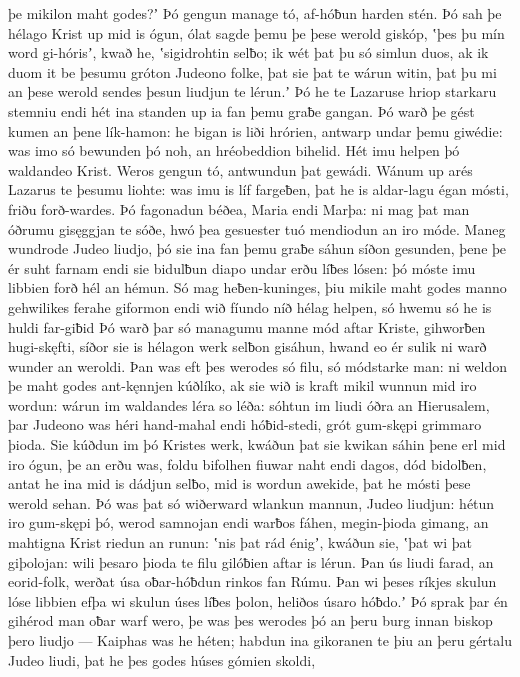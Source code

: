 þe mikilon maht godes?ʼ Þó gengun manage tó,
af-hóƀun harden stén. Þó sah þe hélago Krist
up mid is ógun, ólat sagde
þemu þe þese werold giskóp, ʽþes þu mín word gi-hórisʼ, kwað he,
ʽsigidrohtin selƀo; ik wét þat þu só simlun duos,
ak ik duom it be þesumu gróton Judeono folke,
þat sie þat te wárun witin, þat þu mi an þese werold sendes
þesun liudjun te lérun.ʼ Þó he te Lazaruse hriop
starkaru stemniu endi hét ina standen up
ia fan þemu graƀe gangan. Þó warð þe gést kumen
an þene lík-hamon: he bigan is liði hrórien,
antwarp undar þemu giwédie: was imo só bewunden þó noh,
an hréobeddion bihelid. Hét imu helpen þó
waldandeo Krist. Weros gengun tó,
antwundun þat gewádi. Wánum up arés
Lazarus te þesumu liohte: was imu is líf fargeƀen,
þat he is aldar-lagu égan mósti,
friðu forð-wardes. Þó fagonadun béðea,
Maria endi Marþa: ni mag þat man óðrumu
gisęggjan te sóðe, hwó þea gesuester tuó
mendiodun an iro móde. Maneg wundrode
Judeo liudjo, þó sie ina fan þemu graƀe sáhun
síðon gesunden, þene þe ér suht farnam
endi sie bidulƀun diapo undar erðu
líƀes lósen: þó móste imu libbien forð
hél an hémun. Só mag heƀen-kuninges,
þiu mikile maht godes manno gehwilikes
ferahe giformon endi wið fíundo níð
hélag helpen, só hwemu só he is huldi far-giƀid
Þó warð þar só managumu manne mód aftar Kriste,
gihworƀen hugi-skęfti, síðor sie is hélagon werk
selƀon gisáhun, hwand eo ér sulik ni warð
wunder an weroldi. Þan was eft þes werodes só filu,
só módstarke man: ni weldon þe maht godes
ant-kęnnjen kúðlíko, ak sie wið is kraft mikil
wunnun mid iro wordun: wárun im waldandes
léra so léða: sóhtun im liudi óðra
an Hierusalem, þar Judeono was
héri hand-mahal endi hóƀid-stedi,
grót gum-skępi grimmaro þioda.
Sie kúðdun im þó Kristes werk, kwáðun þat sie kwikan sáhin
þene erl mid iro ógun, þe an erðu was,
foldu bifolhen fiuwar naht endi dagos,
dód bidolƀen, antat he ina mid is dádjun selƀo,
mid is wordun awekide, þat he mósti þese werold sehan.
Þó was þat só wiðerward wlankun mannun,
Judeo liudjun: hétun iro gum-skępi þó,
werod samnojan endi warƀos fáhen,
megin-þioda gimang, an mahtigna Krist
riedun an runun: ʽnis þat rád énigʼ, kwáðun sie,
ʽþat wi þat giþolojan: wili þesaro þioda te filu
gilóƀien aftar is lérun. Þan ús liudi farad,
an eorid-folk, werðat úsa oƀar-hóƀdun
rinkos fan Rúmu. Þan wi þeses ríkjes skulun
lóse libbien efþa wi skulun úses líƀes þolon,
heliðos úsaro hóƀdo.ʼ Þó sprak þar én gihérod man
oƀar warf wero, þe was þes werodes þó
an þeru burg innan biskop þero liudjo
— Kaiphas was he héten; habdun ina gikoranen te þiu
an þeru gértalu Judeo liudi,
þat he þes godes húses gómien skoldi,

